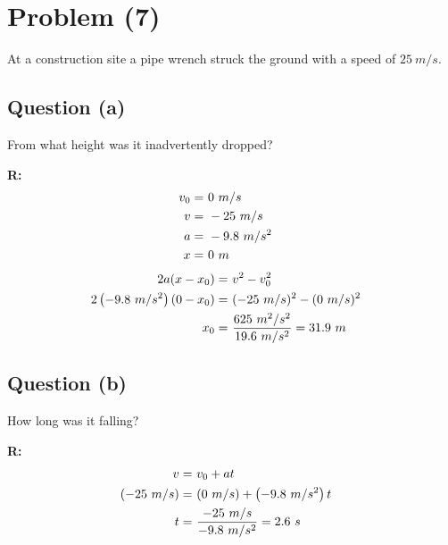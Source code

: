 \section{Problem (7)}
	At a construction site a pipe wrench struck the ground with a speed of $25 \ m/s$.

	\subsection{Question (a)}
		From what height was it inadvertently dropped?

		\textbf{R:} \newline
		\begin{align}
			v_{0} = \ &0 \ m/s& \notag \\
			v = \ &- 25 \ m/s& \notag \\
			a = \ &- 9.8 \ m/s^{2}& \notag \\
			x = \ &0 \ m& \notag
		\end{align}
		\begin{align}
			2a(x - x_{0}) = \ &v^{2} - v_{0}^{2}& \notag \\
			2\left( - 9.8 \ m/s^{2} \right)(0 - x_{0}) = \ &(- 25 \ m/s)^{2} - (0 \ m/s)^{2}& \notag \\
			x_{0} = \ &\frac{625 \ m^{2}/s^{2}}{19.6 \ m/s^{2}} = 31.9 \ m&
		\end{align}

	\subsection{Question (b)}
		How long was it falling?

		\textbf{R:} \newline
		\begin{align}
			v = \ &v_{0} + at& \notag \\
			(-25 \ m/s) = \ &(0 \ m/s) + \left( -9.8 \ m/s^{2} \right) t& \notag \\
			t = \ &\frac{- 25 \ m/s}{-9.8 \ m/s^{2}} = 2.6 \ s& \notag \\
		\end{align}
